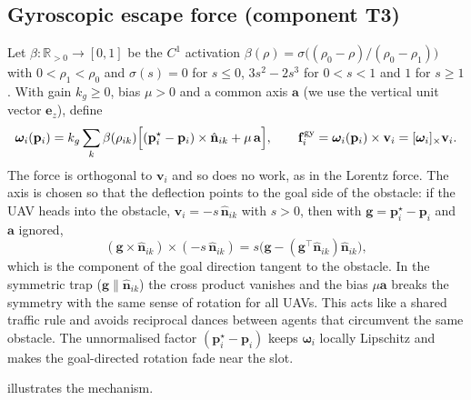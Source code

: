 \documentclass[11pt]{article}
\theoremstyle{definition}
\theoremstyle{remark}
\newcommand{\R}{\mathbb{R}}
\newcommand{\bp}{\mathbf{p}}
\newcommand{\bv}{\mathbf{v}}
\newcommand{\ba}{\mathbf{a}}
\newcommand{\bomega}{\bm{\omega}}
\newcommand{\bn}{\hat{\mathbf{n}}}
\begin{document}
\subsection{Gyroscopic escape force (component T3)}
Let $\beta:\R_{>0}\to[0,1]$ be the $C^1$ activation $\beta(\rho)=\sigma\bigl((\rho_0-\rho)/(\rho_0-\rho_1)\bigr)$
with $0<\rho_1<\rho_0$ and $\sigma(s)=0$ for $s\le0$, $3s^2-2s^3$ for $0<s<1$
and $1$ for $s\ge1$. With gain $k_g\ge0$, bias $\mu>0$ and a common axis $\ba$
(we use the vertical unit vector $\mathbf{e}_z$), define
\begin{equation}\label{eq:omega}
  \bomega_i(\bp_i)=k_g\sum_{k}\beta(\rho_{ik})\Bigl[(\bp_i^\star-\bp_i)\times\bn_{ik}+\mu\,\ba\Bigr],
  \qquad \mathbf{f}^{\mathrm{gy}}_i=\bomega_i(\bp_i)\times\bv_i=[\bomega_i]_\times\bv_i .
\end{equation}
The force is orthogonal to $\bv_i$ and so does no work, as in the Lorentz force.
The axis is chosen so that the deflection points to the goal side of the
obstacle: if the UAV heads into the obstacle, $\bv_i=-s\,\bn_{ik}$ with $s>0$,
then with $\mathbf{g}=\bp_i^\star-\bp_i$ and $\ba$ ignored,
\begin{equation}
  (\mathbf{g}\times\bn_{ik})\times(-s\,\bn_{ik})=s\bigl(\mathbf{g}-(\mathbf{g}^\top\bn_{ik})\bn_{ik}\bigr),
\end{equation}
which is the component of the goal direction tangent to the obstacle. In the
symmetric trap ($\mathbf{g}\parallel\bn_{ik}$) the cross product vanishes and the
bias $\mu\ba$ breaks the symmetry with the same sense of rotation for all UAVs.
This acts like a shared traffic rule and avoids reciprocal dances between
agents that circumvent the same obstacle. The unnormalised factor
$(\bp_i^\star-\bp_i)$ keeps $\bomega_i$ locally Lipschitz and makes the
goal-directed rotation fade near the slot.

 illustrates the mechanism.
\end{document}
